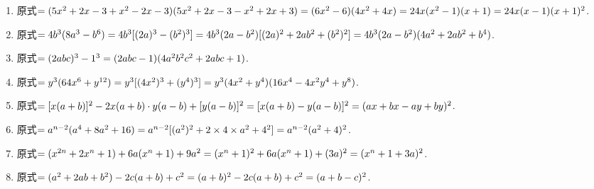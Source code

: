 \documentclass[a4paper,12pt]{article}
\begin{document}
{\begin{multicols}{2}
\begin{enumerate}
	\item 原式$=( 5 x ^ { 2 } + 2 x - 3 + x ^ { 2 } - 2 x - 3 ) ( 5 x ^ { 2 } + 2 x - 3 - x ^ { 2 } + 2 x + 3 ) \\ = ( 6 x ^ { 2 } - 6 ) ( 4 x ^ { 2 } + 4 x ) \\ = 2 4 x ( x ^ { 2 } - 1 ) ( x + 1 ) \\ = 2 4 x ( x - 1 ) ( x + 1 ) ^ { 2 }$.
	
	\item 原式$=4 b ^ { 3 } ( 8 a ^ { 3 } - b ^ { 6 } ) = 4 b ^ { 3 } [ ( 2 a ) ^ { 3 } - ( b ^ { 2 } ) ^ { 3 } ] \\ = 4 b ^ { 3 } ( 2 a - b ^ { 2 } ) [ ( 2 a ) ^ { 2 } + 2 a b ^ { 2 } + ( b ^ { 2 } ) ^ { 2 } ] \\ = 4 b ^ { 3 } ( 2 a - b ^ { 2 } ) ( 4 a ^ { 2 } + 2 a b ^ { 2 } + b ^ { 4 } )$.
	
	\item 原式$=( 2 a b c ) ^ { 3 } - 1 ^ { 3 } \\ = ( 2 a b c - 1 ) ( 4 a ^ { 2 } b ^ { 2 } c ^ { 2 } + 2 a b c + 1 )$.
	
	\item 原式$=y ^ { 3 } ( 6 4 x ^ { 6 } + y ^ { 1 2 } ) \\ = y ^ { 3 } [ ( 4 x ^ { 2 } ) ^ { 3 } + ( y ^ { 4 } ) ^ { 3 } ] \\ = y ^ { 3 } ( 4 x ^ { 2 } + y ^ { 4 } ) ( 1 6 x ^ { 4 } - 4 x ^ { 2 } y ^ { 4 } + y ^ { 8 } )$.
	
	\item 原式$=[ x ( a + b ) ] ^ { 2 } - 2 x ( a + b ) \cdot y ( a - b ) + [ y ( a - b ) ] ^ { 2 } \\ = [ x ( a + b ) - y ( a - b ) ] ^ { 2 } \\ = ( a x + b x - a y + b y ) ^ { 2 }$.
	
	\item 原式$=a ^ { n - 2 } ( a ^ { 4 } + 8 a ^ { 2 } + 1 6 ) \\ = a ^ { n - 2 } [ ( a ^ { 2 } ) ^ { 2 } + 2 \times 4 \times a ^ { 2 } + 4 ^ { 2 } ] \\ = a ^ { n - 2 } ( a ^ { 2 } + 4 ) ^ { 2 }$.
	
	\item 原式$=( x ^ { 2 n } + 2 x ^ { n } + 1 ) + 6 a ( x ^ { n } + 1 ) + 9 a ^ { 2 } \\ = ( x ^ { n } + 1 ) ^ { 2 } + 6 a ( x ^ { n } + 1 ) + ( 3 a ) ^ { 2 } \\ = ( x ^ { n } + 1 + 3 a ) ^ { 2 }$.
	
	\item 原式$=( a ^ { 2 } + 2 a b + b ^ { 2 } ) - 2 c ( a + b ) + c ^ { 2 } \\ = ( a + b ) ^ { 2 } - 2 c ( a + b ) + c ^ { 2 } \\ = ( a + b - c ) ^ { 2 }$.
	

\end{enumerate}
\end{multicols}}
\end{document}
